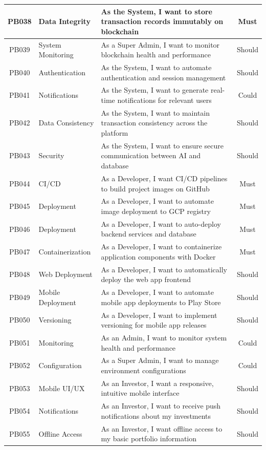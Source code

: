 \begin{longtable}{|c|l|p{8cm}|c|}
    \hline
    PB038 & Data Integrity & As the System, I want to store transaction records immutably on blockchain & Must \\
    \hline
    PB039 & System Monitoring & As a Super Admin, I want to monitor blockchain health and performance & Should \\
    \hline
    PB040 & Authentication & As the System, I want to automate authentication and session management & Should \\
    \hline
    PB041 & Notifications & As the System, I want to generate real-time notifications for relevant users & Could \\
    \hline
    PB042 & Data Consistency & As the System, I want to maintain transaction consistency across the platform & Should \\
    \hline
    PB043 & Security & As the System, I want to ensure secure communication between AI and database & Should \\
    \hline
    PB044 & CI/CD & As a Developer, I want CI/CD pipelines to build project images on GitHub & Must \\
    \hline
    PB045 & Deployment & As a Developer, I want to automate image deployment to GCP registry & Must \\
    \hline
    PB046 & Deployment & As a Developer, I want to auto-deploy backend services and database & Must \\
    \hline
    PB047 & Containerization & As a Developer, I want to containerize application components with Docker & Must \\
    \hline
    PB048 & Web Deployment & As a Developer, I want to automatically deploy the web app frontend & Should \\
    \hline
    PB049 & Mobile Deployment & As a Developer, I want to automate mobile app deployments to Play Store & Should \\
    \hline
    PB050 & Versioning & As a Developer, I want to implement versioning for mobile app releases & Should \\
    \hline
    PB051 & Monitoring & As an Admin, I want to monitor system health and performance & Could \\
    \hline
    PB052 & Configuration & As a Super Admin, I want to manage environment configurations & Could \\
    \hline
    PB053 & Mobile UI/UX & As an Investor, I want a responsive, intuitive mobile interface & Should \\
    \hline
    PB054 & Notifications & As an Investor, I want to receive push notifications about my investments & Should \\
    \hline
    PB055 & Offline Access & As an Investor, I want offline access to my basic portfolio information & Should \\
\end{longtable}

